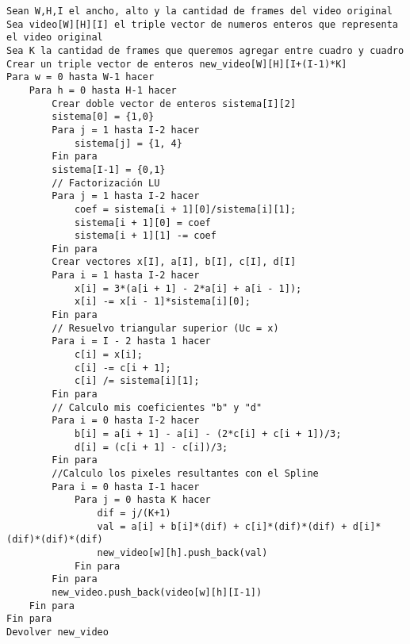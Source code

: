 \begin{lstlisting}
Sean W,H,I el ancho, alto y la cantidad de frames del video original
Sea video[W][H][I] el triple vector de numeros enteros que representa el video original
Sea K la cantidad de frames que queremos agregar entre cuadro y cuadro
Crear un triple vector de enteros new_video[W][H][I+(I-1)*K]
Para w = 0 hasta W-1 hacer
	Para h = 0 hasta H-1 hacer
		Crear doble vector de enteros sistema[I][2]
		sistema[0] = {1,0}
		Para j = 1 hasta I-2 hacer
			sistema[j] = {1, 4}
		Fin para
		sistema[I-1] = {0,1}
		// Factorización LU
		Para j = 1 hasta I-2 hacer
			coef = sistema[i + 1][0]/sistema[i][1];
			sistema[i + 1][0] = coef
			sistema[i + 1][1] -= coef
		Fin para
		Crear vectores x[I], a[I], b[I], c[I], d[I]
		Para i = 1 hasta I-2 hacer
			x[i] = 3*(a[i + 1] - 2*a[i] + a[i - 1]);
			x[i] -= x[i - 1]*sistema[i][0];
		Fin para
		// Resuelvo triangular superior (Uc = x)
		Para i = I - 2 hasta 1 hacer
			c[i] = x[i];
			c[i] -= c[i + 1];
			c[i] /= sistema[i][1];
		Fin para
		// Calculo mis coeficientes "b" y "d"
		Para i = 0 hasta I-2 hacer
			b[i] = a[i + 1] - a[i] - (2*c[i] + c[i + 1])/3;
			d[i] = (c[i + 1] - c[i])/3;
		Fin para
		//Calculo los pixeles resultantes con el Spline
		Para i = 0 hasta I-1 hacer
			Para j = 0 hasta K hacer
				dif = j/(K+1)
				val = a[i] + b[i]*(dif) + c[i]*(dif)*(dif) + d[i]*(dif)*(dif)*(dif)
				new_video[w][h].push_back(val)
			Fin para
		Fin para
		new_video.push_back(video[w][h][I-1])
	Fin para
Fin para
Devolver new_video
\end{lstlisting}

